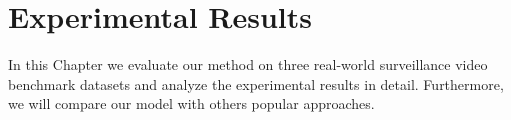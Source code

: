 \chapter{Experimental Results}
\label{chap:experiment}
In this Chapter we evaluate our method on three real-world surveillance video benchmark datasets and analyze the experimental results in detail. Furthermore, we will compare our model with others popular approaches.
